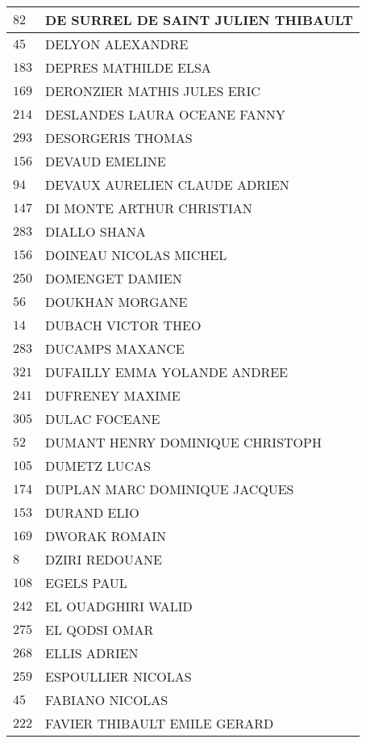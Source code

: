 \begin{xltabular}{\linewidth}{|l|X|}
    \hline
    $82$ & DE SURREL DE SAINT JULIEN THIBAULT \\
    \hline
    $45$ & DELYON ALEXANDRE \\
    \hline
    $183$ & DEPRES MATHILDE ELSA \\
    \hline
    $169$ & DERONZIER MATHIS JULES ERIC \\
    \hline
    $214$ & DESLANDES LAURA OCEANE FANNY \\
    \hline
    $293$ & DESORGERIS THOMAS \\
    \hline
    $156$ & DEVAUD EMELINE \\
    \hline
    $94$ & DEVAUX AURELIEN CLAUDE ADRIEN \\
    \hline
    $147$ & DI MONTE ARTHUR CHRISTIAN \\
    \hline
    $283$ & DIALLO SHANA \\
    \hline
    $156$ & DOINEAU NICOLAS MICHEL \\
    \hline
    $250$ & DOMENGET DAMIEN \\
    \hline
    $56$ & DOUKHAN MORGANE \\
    \hline
    $14$ & DUBACH VICTOR THEO \\
    \hline
    $283$ & DUCAMPS MAXANCE \\
    \hline
    $321$ & DUFAILLY EMMA YOLANDE ANDREE \\
    \hline
    $241$ & DUFRENEY MAXIME \\
    \hline
    $305$ & DULAC FOCEANE \\
    \hline
    $52$ & DUMANT HENRY DOMINIQUE CHRISTOPH \\
    \hline
    $105$ & DUMETZ LUCAS \\
    \hline
    $174$ & DUPLAN MARC DOMINIQUE JACQUES \\
    \hline
    $153$ & DURAND ELIO \\
    \hline
    $169$ & DWORAK ROMAIN \\
    \hline
    $8$ & DZIRI REDOUANE \\
    \hline
    $108$ & EGELS PAUL \\
    \hline
    $242$ & EL OUADGHIRI WALID \\
    \hline
    $275$ & EL QODSI OMAR \\
    \hline
    $268$ & ELLIS ADRIEN \\
    \hline
    $259$ & ESPOULLIER NICOLAS \\
    \hline
    $45$ & FABIANO NICOLAS \\
    \hline
    $222$ & FAVIER THIBAULT EMILE GERARD \\

\end{xltabular}

